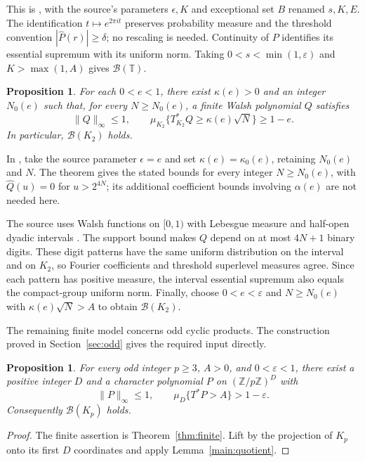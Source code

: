 \documentclass[11pt]{amsart}
\newtheorem{proposition}[theorem]{Proposition}
\theoremstyle{definition}
\theoremstyle{remark}
\newcommand{\B}{\mathcal B}
\begin{document}
This is \cite[Lemma 7, p.~9]{K99}, with the source's parameters
\(\epsilon,K\) and exceptional set \(B\) renamed \(s,K,E\).
The identification \(t\mapsto e^{2\pi it}\) preserves probability
measure and the threshold convention \(|\widehat P(r)|\geq\delta\);
no rescaling is needed. Continuity of \(P\) identifies its essential
supremum with its uniform norm. Taking
\(0<s<\min(1,\varepsilon)\) and \(K>\max(1,A)\) gives
\(\B(\mathbb T)\).

\begin{proposition}\label{main:walsh}
For each \(0<e<1\), there exist \(\kappa(e)>0\)
and an integer \(N_0(e)\) such that, for every \(N\geq N_0(e)\),
a finite Walsh polynomial \(Q\) satisfies
\[
 \|Q\|_\infty\leq1,\qquad
 \mu_{K_2}\{T^*_{K_2}Q\geq\kappa(e)\sqrt N\}\geq1-e.
\]
In particular, \(\B(K_2)\) holds.
\end{proposition}

In \cite[Theorem 6.5, p.~723]{K06}, take the source parameter
\(\epsilon=e\) and set \(\kappa(e)=\kappa_0(e)\), retaining
\(N_0(e)\) and \(N\). The theorem gives the stated bounds for every
integer \(N\geq N_0(e)\), with \(\widehat Q(u)=0\) for
\(u>2^{4N}\); its additional coefficient bounds involving
\(\alpha(e)\) are not needed here.

The source uses Walsh functions on \([0,1)\) with Lebesgue measure
and half-open dyadic intervals \cite[p.~709]{K06}. The support bound
makes \(Q\) depend on at most \(4N+1\) binary digits. These digit
patterns have the same uniform distribution on the interval and
on \(K_2\), so Fourier coefficients and threshold superlevel measures
agree. Since each pattern has positive measure, the interval
essential supremum also equals the compact-group uniform norm.
Finally, choose \(0<e<\varepsilon\) and \(N\geq N_0(e)\) with
\(\kappa(e)\sqrt N>A\) to obtain \(\B(K_2)\).

The remaining finite model concerns odd cyclic products. The construction
proved in Section~\ref{sec:odd} gives the required input directly.

\begin{proposition}\label{main:oddinput}
For every odd integer \(p\geq3\), \(A>0\), and \(0<\varepsilon<1\),
there exist a positive integer \(D\) and a character polynomial \(P\) on
\((\mathbb Z/p\mathbb Z)^D\) with
\[
 \|P\|_\infty\leq1,\qquad \mu_D\{T^*P>A\}>1-\varepsilon.
\]
Consequently \(\B(K_p)\) holds.
\end{proposition}

\begin{proof}
The finite assertion is Theorem~\ref{thm:finite}. Lift by the projection of \(K_p\) onto
its first \(D\) coordinates and apply Lemma~\ref{main:quotient}.
\end{proof}
\end{document}
